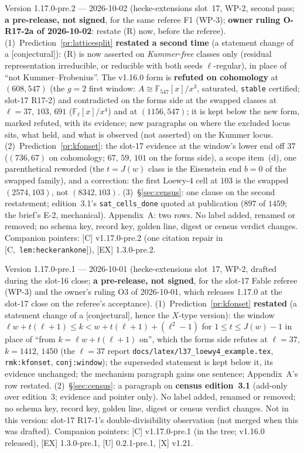 \documentclass[11pt]{article}
\theoremstyle{remark}
\newcommand{\F}{\mathbb{F}}
\newcommand{\Fl}{\F_\ell}
\newcommand{\HA}[1]{[C,~\texttt{#1}]}      %
\newcommand{\CONJ}{\textsf{[conjectural]}}
\begin{document}
Version 1.17.0-pre.2 --- 2026-10-02 (hecke-extensions slot~17, WP-2, second pass; \textbf{a pre-release, not signed}, for the same referee F1
(WP-3); \textbf{owner ruling O-R17-2a of 2026-10-02}: restate (R) now, before the referee). (1)~Prediction~\ref{pr:latticesplit} \textbf{restated a second
time} (a statement change of a \CONJ): (R) is now asserted on \emph{Kummer-free} classes only (residual representation irreducible, or reducible with both seeds
$\ell$-regular), in place of ``not Kummer--Frobenius''. The v1.16.0 form is \textbf{refuted on cohomology} at $(608,547)$ (the $g=2$ first window:
$A\cong\F_{547}[x]/x^3$, saturated, \texttt{stable} certified; slot-17 R17-2) and contradicted on the forms side at the swapped classes at $\ell=37$, $103$,
$691$ ($\Fl[x]/x^4$) and at $(1156,547)$; it is kept below the new form, marked refuted, with its evidence; new paragraphs on where the excluded locus sits, what
held, and what is observed (not asserted) on the Kummer locus. (2)~Prediction~\ref{pr:kfonset}: the slot-17 evidence at the window's lower end off $37$
($(736,67)$ on cohomology; $67$, $59$, $101$ on the forms side), a scope item~(d), one parenthetical reworded (the $t=J(w)$ class is the Eisenstein end $b=0$ of
the swapped family), and a correction: the first Loewy-$4$ cell at $103$ is the swapped $(2574,103)$, not $(8342,103)$. (3)~\S\ref{sec:census}: one clause on the
second restatement; edition~3.1's \texttt{sat\_cells\_done} quoted at publication ($897$ of $1459$; the brief's E-2, mechanical). Appendix~A: two rows. No label
added, renamed or removed; no schema key, record key, golden line, digest or census verdict changes. Companion pointers: [C] v1.17.0-pre.2 (one citation repair
in \HA{lem:heckerankone}), [EX] 1.3.0-pre.2.

Version 1.17.0-pre.1 --- 2026-10-01 (hecke-extensions slot~17, WP-2, drafted during the slot-16 close; \textbf{a pre-release, not signed},
for the slot-17 Fable referee (WP-3) and the owner's ruling O3 of 2026-10-01, which releases 1.17.0 at the slot-17 close on the referee's acceptance).
(1)~Prediction~\ref{pr:kfonset} \textbf{restated} (a statement change of a \CONJ, hence the $X$-type version): the window
$\ell w+t(\ell+1)\le k<w+t(\ell+1)+(\ell^{2}-1)$ for $1\le t\le J(w)-1$ in place of ``from $k=\ell w+t(\ell+1)$ on'', which the forms side refutes at
$\ell=37$, $k=1412$, $1450$ (the $\ell=37$ report \texttt{docs/latex/l37\_loewy4\_example.tex}, \texttt{rmk:kfonset}, \texttt{conj:window}); the
superseded statement is kept below it, its evidence unchanged; the mechanism paragraph gains one sentence; Appendix~A's row restated. (2)~\S\ref{sec:census}:
a paragraph on \textbf{census edition~3.1} (add-only over edition~3; evidence and pointer only). No label added, renamed or removed; no schema key, record
key, golden line, digest or census verdict changes. Not in this version: slot-17 R17-1's double-divisibility observation (not merged when this was
drafted). Companion pointers: [C] v1.17.0-pre.1 (in the tree; v1.16.0 released), [EX] 1.3.0-pre.1, [U] 0.2.1-pre.1, [X] v1.21.
\end{document}
